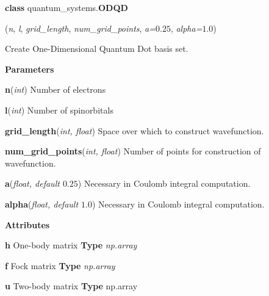 \begin{tcolorbox}
    {\selectfont
    \textbf{class} quantum\_systems.\textbf{ODQD}

    \hspace{1em}(\emph{n}, \emph{l}, \emph{grid\_length}, \emph{num\_grid\_points}, 
    \emph{a=$0.25$}, \emph{alpha=$1.0$})

    \vspace{1em}
    Create One-Dimensional Quantum Dot basis set.
    \vspace{1em}

    \textbf{Parameters}

    \hspace{2em}\textbf{n}(\emph{int}) Number of electrons
    
    \hspace{2em}\textbf{l}(\emph{int}) Number of spinorbitals
    
    \hspace{2em}\textbf{grid\_length}(\emph{int, float}) Space over which to 
        construct wavefunction.
    
    \hspace{2em}\textbf{num\_grid\_points}(\emph{int, float}) Number of 
        points for construction of wavefunction.

    \hspace{2em}\textbf{a}(\emph{float, default $0.25$}) Necessary in Coulomb 
        integral computation.
    
    \hspace{2em}\textbf{alpha}(\emph{float, default $1.0$}) Necessary in Coulomb 
        integral computation.

    \vspace{1em}
    \textbf{Attributes}

    \hspace{2em} \textbf{h}
    One-body matrix 
    \textbf{Type} \emph{np.array}
    
    \hspace{2em} \textbf{f}
    Fock matrix
    \textbf{Type} \emph{np.array}

    \hspace{2em} \textbf{u}
    Two-body matrix
    \textbf{Type} np.array



}
\end{tcolorbox}
